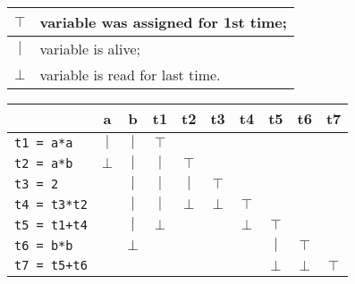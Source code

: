 \documentclass[docid=2020]{comp_test2}
\begin{document}
\noindent
\begin{minipage}{0.58\textwidth}
    \begin{tabular}{c | l}
        $\top$  & variable was assigned for 1st time;\\ \hline
        $\vert$ & variable is alive;\\ \hline
        $\bot$  & variable is read for last time.
    \end{tabular}

\begin{center}
    \begin{tabular}{l | c c c c c c c c c}
                            & a       & b       & t1       & t2       & t3       & t4       & t5       & t6       & t7       \\ \hline
        \texttt{t1 = a*a  } & $\vert$ & $\vert$ & $\top$   &          &          &          &          &          &          \\ \hline
        \texttt{t2 = a*b  } & $\bot$  & $\vert$ & $\vert$  & $\top$   &          &          &          &          &          \\ \hline
        \texttt{t3 = 2    } &         & $\vert$ & $\vert$  & $\vert$  & $\top$   &          &          &          &          \\ \hline
        \texttt{t4 = t3*t2} &         & $\vert$ & $\vert$  & $\bot$   & $\bot$   & $\top$   &          &          &          \\ \hline
        \texttt{t5 = t1+t4} &         & $\vert$ & $\bot$   &          &          & $\bot$   & $\top$   &          &          \\ \hline
        \texttt{t6 = b*b  } &         & $\bot$  &          &          &          &          & $\vert$  & $\top$   &          \\ \hline
        \texttt{t7 = t5+t6} &         &         &          &          &          &          & $\bot$   & $\bot$   & $\top$   
    \end{tabular}
\end{center}
\end{minipage}
\end{document}
